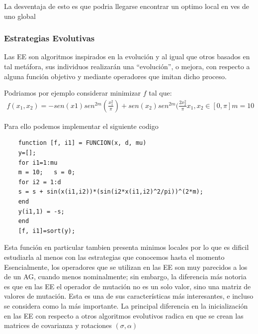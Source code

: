 \documentclass{article}
\begin{document}
La desventaja de esto es que podria llegarse encontrar un optimo local en ves de uno global

\subsubsection{Estrategias Evolutivas}

Las EE son algoritmos inspirados en la evolución y al igual que otros basados en tal metáfora, sus individuos realizarán una “evolución”, o mejora, con respecto a alguna función objetivo y mediante operadores que imitan dicho proceso.

Podriamos por ejemplo considerar minimizar $f$ tal que:
\begin{align*}
   f(x_1,x_2)=-sen(x1)sen^{2m}(\frac{x_1^2}{\pi})+sen(x_2)sen^{2m}(\frac{2x_2^2}{\pi}
   x_1,x_2 \in [0,\pi]
   m=10
\end{align*}

Para ello podemos implementar el siguiente codigo

\begin{verbatim}
    function [f, i1] = FUNCION(x, d, mu) 
    y=[];
    for i1=1:mu   
    m = 10;   s = 0;   
    for i2 = 1:d       
    s = s + sin(x(i1,i2))*(sin(i2*x(i1,i2)^2/pi))^(2*m);   
    end   
    y(i1,1) = -s; 
    end
    [f, i1]=sort(y);
\end{verbatim}
Esta función en particular tambien presenta minimos locales por lo que es dificil estudiarla al menos con las estrategias que conocemos hasta el momento
Esencialmente, los operadores que se utilizan en las EE son muy parecidos a los de un AG, cuando menos nominalmente; sin embargo, la diferencia más notoria es que en las EE el operador de mutación no es un solo valor, sino una matriz de valores de mutación. Esta es una de sus características más interesantes, e incluso se considera como la más importante.
La principal diferencia en la inicialización en las EE con respecto a otros algoritmos evolutivos radica en que se crean las matrices de covarianza y rotaciones $(\sigma,\alpha)$
\end{document}
